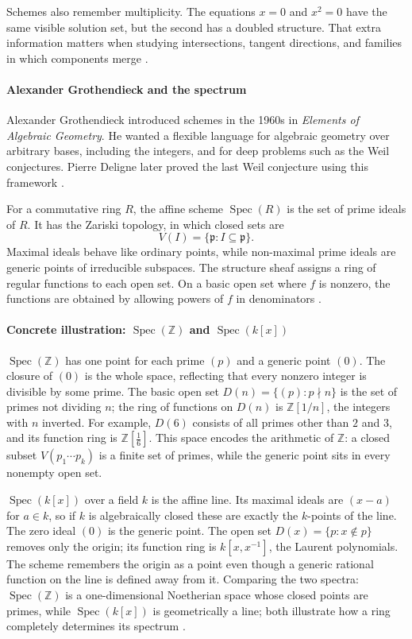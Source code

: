 Schemes also remember multiplicity. The equations $x=0$ and $x^2=0$ have the same visible solution set, but the second has a doubled structure. That extra information matters when studying intersections, tangent directions, and families in which components merge \cite{scheme_ref2}.

\paragraph{Alexander Grothendieck and the spectrum}
Alexander Grothendieck introduced schemes in the 1960s in \emph{Elements of Algebraic Geometry}. He wanted a flexible language for algebraic geometry over arbitrary bases, including the integers, and for deep problems such as the Weil conjectures. Pierre Deligne later proved the last Weil conjecture using this framework \cite{scheme_ref1,scheme_ref3}.

For a commutative ring $R$, the affine scheme $\operatorname{Spec}(R)$ is the set of prime ideals of $R$. It has the Zariski topology, in which closed sets are
\[
V(I)=\{\mathfrak p:I\subseteq\mathfrak p\}.
\]
Maximal ideals behave like ordinary points, while non-maximal prime ideals are generic points of irreducible subspaces. The structure sheaf assigns a ring of regular functions to each open set. On a basic open set where $f$ is nonzero, the functions are obtained by allowing powers of $f$ in denominators \cite{scheme_ref2}.

\paragraph{Concrete illustration: $\operatorname{Spec}(\mathbb{Z})$ and $\operatorname{Spec}(k[x])$}
$\operatorname{Spec}(\mathbb{Z})$ has one point for each prime $(p)$ and a generic point $(0)$. The closure of $(0)$ is the whole space, reflecting that every nonzero integer is divisible by some prime. The basic open set $D(n)=\{(p):p\nmid n\}$ is the set of primes not dividing $n$; the ring of functions on $D(n)$ is $\mathbb{Z}[1/n]$, the integers with $n$ inverted. For example, $D(6)$ consists of all primes other than $2$ and $3$, and its function ring is $\mathbb{Z}[\tfrac{1}{6}]$. This space encodes the arithmetic of $\mathbb{Z}$: a closed subset $V(p_1\cdots p_k)$ is a finite set of primes, while the generic point sits in every nonempty open set.

$\operatorname{Spec}(k[x])$ over a field $k$ is the affine line. Its maximal ideals are $(x-a)$ for $a\in k$, so if $k$ is algebraically closed these are exactly the $k$-points of the line. The zero ideal $(0)$ is the generic point. The open set $D(x)=\{p:x\notin p\}$ removes only the origin; its function ring is $k[x,x^{-1}]$, the Laurent polynomials. The scheme remembers the origin as a point even though a generic rational function on the line is defined away from it. Comparing the two spectra: $\operatorname{Spec}(\mathbb{Z})$ is a one-dimensional Noetherian space whose closed points are primes, while $\operatorname{Spec}(k[x])$ is geometrically a line; both illustrate how a ring completely determines its spectrum \cite{scheme_ref1,scheme_ref2}.


